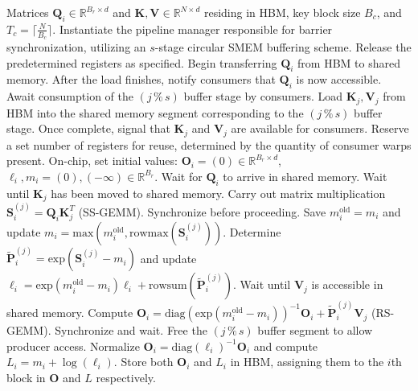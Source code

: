 \begin{algorithm}[H]
    \caption{\small\label{alg:flash3_wgmma_ws_only}\textsc{FlashAttention-3} forward pass \textbf{without} intra-consumer overlapping -- CTA perspective}
    \begin{algorithmic}[1]
\REQUIRE Matrices $\mathbf{Q}_i \in \mathbb{R}^{B_r \times d}$ and $\mathbf{K}, \mathbf{V} \in \mathbb{R}^{N \times d}$ residing in HBM, key block size $B_c$, and $T_c = \lceil \frac{N}{B_c} \rceil$.
\STATE Instantiate the pipeline manager responsible for barrier synchronization, utilizing an $s$-stage circular SMEM buffering scheme.
\STATE Release the predetermined registers as specified.
\STATE Begin transferring $\mathbf{Q}_i$ from HBM to shared memory.
\STATE After the load finishes, notify consumers that $\mathbf{Q}_i$ is now accessible.
    \STATE Await consumption of the $(j\,\%\,s)$ buffer stage by consumers.
    \STATE Load $\mathbf{K}_j, \mathbf{V}_j$ from HBM into the shared memory segment corresponding to the $(j\,\%\,s)$ buffer stage.
    \STATE Once complete, signal that $\mathbf{K}_j$ and $\mathbf{V}_j$ are available for consumers.
\ENDFOR
\ELSE \STATE Reserve a set number of registers for reuse, determined by the quantity of consumer warps present.
\STATE On-chip, set initial values: $\mathbf{O}_i = (0) \in \mathbb{R}^{B_r \times d}$, $\ell_i, m_i = (0), (-\infty) \in \mathbb{R}^{B_r}$.
\STATE Wait for $\mathbf{Q}_i$ to arrive in shared memory.
\STATE Wait until $\mathbf{K}_j$ has been moved to shared memory.
\STATE Carry out matrix multiplication $\mathbf{S}_i^{(j)} = \mathbf{Q}_i \mathbf{K}_j^T$ (SS-GEMM). Synchronize before proceeding. \label{alg:ws_only_gemm1}
\STATE Save $m_i^{\mathrm{old}} = m_i$ and update $m_i = \mathrm{max}(m_i^{\mathrm{old}}, \mathrm{rowmax}(\mathbf{S}_i^{(j)}))$. \label{code-ws:softmax_start}
\STATE Determine $\widetilde{\mathbf{P}}_i^{(j)} = \mathrm{exp}(\mathbf{S}_i^{(j)} - m_i)$ and update $\ell_i = \mathrm{exp}(m_i^{\mathrm{old}} - m_i) \ell_i + \mathrm{rowsum}(\widetilde{\mathbf{P}}_i^{(j)})$. \label{code-ws:softmax_end}
\STATE Wait until $\mathbf{V}_j$ is accessible in shared memory.
\STATE Compute $\mathbf{O}_i = \mathrm{diag}(\mathrm{exp}(m_i^{\mathrm{old}} - m_i))^{-1} \mathbf{O}_i + \widetilde{\mathbf{P}}_i^{(j)} \mathbf{V}_j$ (RS-GEMM). Synchronize and wait. \label{alg:ws_only_gemm2}
\STATE Free the $(j\,\%\,s)$ buffer segment to allow producer access.
\ENDFOR
\STATE Normalize $\mathbf{O}_i = \mathrm{diag}(\ell_i)^{-1} \mathbf{O}_i$ and compute $L_i = m_i + \log(\ell_i)$.
\STATE Store both $\mathbf{O}_i$ and $L_i$ in HBM, assigning them to the $i$th block in $\mathbf{O}$ and $L$ respectively.
\ENDIF
\end{algorithmic}
\end{algorithm}

